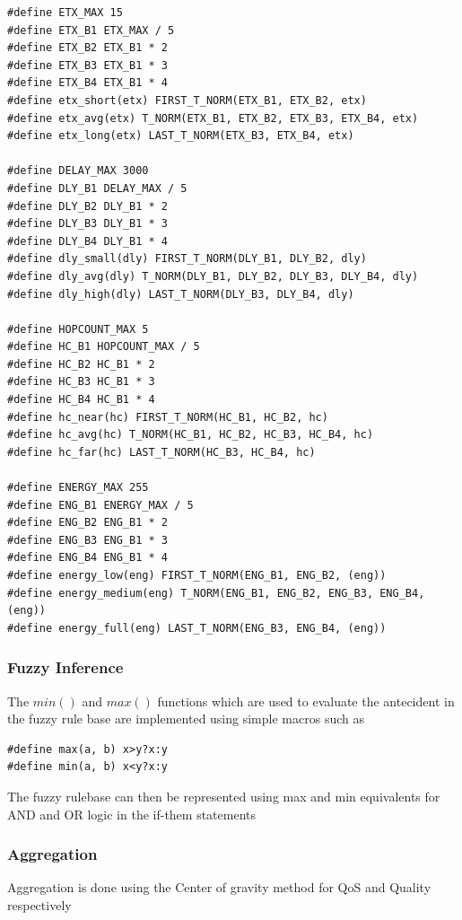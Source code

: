 \begin{verbatim}
#define ETX_MAX 15
#define ETX_B1 ETX_MAX / 5
#define ETX_B2 ETX_B1 * 2
#define ETX_B3 ETX_B1 * 3
#define ETX_B4 ETX_B1 * 4
#define etx_short(etx) FIRST_T_NORM(ETX_B1, ETX_B2, etx)
#define etx_avg(etx) T_NORM(ETX_B1, ETX_B2, ETX_B3, ETX_B4, etx)
#define etx_long(etx) LAST_T_NORM(ETX_B3, ETX_B4, etx)

#define DELAY_MAX 3000
#define DLY_B1 DELAY_MAX / 5
#define DLY_B2 DLY_B1 * 2
#define DLY_B3 DLY_B1 * 3
#define DLY_B4 DLY_B1 * 4
#define dly_small(dly) FIRST_T_NORM(DLY_B1, DLY_B2, dly)
#define dly_avg(dly) T_NORM(DLY_B1, DLY_B2, DLY_B3, DLY_B4, dly)
#define dly_high(dly) LAST_T_NORM(DLY_B3, DLY_B4, dly)

#define HOPCOUNT_MAX 5
#define HC_B1 HOPCOUNT_MAX / 5
#define HC_B2 HC_B1 * 2
#define HC_B3 HC_B1 * 3
#define HC_B4 HC_B1 * 4
#define hc_near(hc) FIRST_T_NORM(HC_B1, HC_B2, hc)
#define hc_avg(hc) T_NORM(HC_B1, HC_B2, HC_B3, HC_B4, hc)
#define hc_far(hc) LAST_T_NORM(HC_B3, HC_B4, hc)

#define ENERGY_MAX 255
#define ENG_B1 ENERGY_MAX / 5
#define ENG_B2 ENG_B1 * 2
#define ENG_B3 ENG_B1 * 3
#define ENG_B4 ENG_B1 * 4
#define energy_low(eng) FIRST_T_NORM(ENG_B1, ENG_B2, (eng))
#define energy_medium(eng) T_NORM(ENG_B1, ENG_B2, ENG_B3, ENG_B4, (eng))
#define energy_full(eng) LAST_T_NORM(ENG_B3, ENG_B4, (eng))
\end{verbatim}
\subsubsection{Fuzzy Inference} \label{Fuzzy Inference}
The $min()$ and $max()$ functions which are used to evaluate the antecident in the fuzzy rule base are implemented using simple macros such as
\begin{verbatim}
#define max(a, b) x>y?x:y
#define min(a, b) x<y?x:y
\end{verbatim}
The fuzzy rulebase can then be represented using max and min equivalents for AND and OR logic in the if-them statements
\subsubsection{Aggregation} \label{Aggregation}
Aggregation is done using the Center of gravity method for QoS and Quality respectively